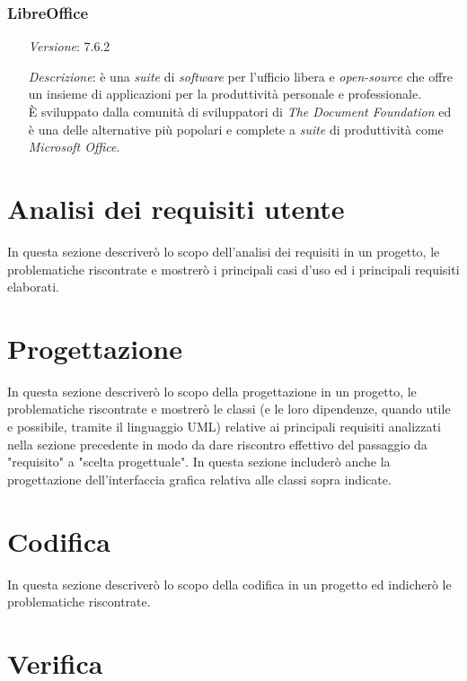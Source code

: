 \subsubsection*{LibreOffice}
\begin{itemize}
    \item [\textit{Versione}:] 7.6.2
    \item [\textit{Descrizione}:] è una \textit{suite} di \textit{software} per l'ufficio libera e \textit{open-source} che offre un insieme di applicazioni per la produttività personale e professionale. \\
                È sviluppato dalla comunità di sviluppatori di \textit{The Document Foundation} ed è una delle alternative più popolari e complete a \textit{suite} di produttività come \textit{Microsoft Office}.
\end{itemize}

\section{Analisi dei requisiti utente}

In questa sezione descriverò lo scopo dell'analisi dei requisiti in un progetto, le problematiche riscontrate e mostrerò i principali casi d'uso ed i principali requisiti elaborati.

\section{Progettazione}

In questa sezione descriverò lo scopo della progettazione in un progetto, le problematiche riscontrate e mostrerò le classi (e le loro dipendenze, quando utile e possibile, tramite il linguaggio UML) relative ai principali requisiti analizzati nella sezione precedente in modo da dare riscontro effettivo del passaggio da "requisito" a "scelta progettuale".
In questa sezione includerò anche la progettazione dell'interfaccia grafica relativa alle classi sopra indicate.

\section{Codifica}

In questa sezione descriverò lo scopo della codifica in un progetto ed indicherò le problematiche riscontrate.

\section{Verifica}

